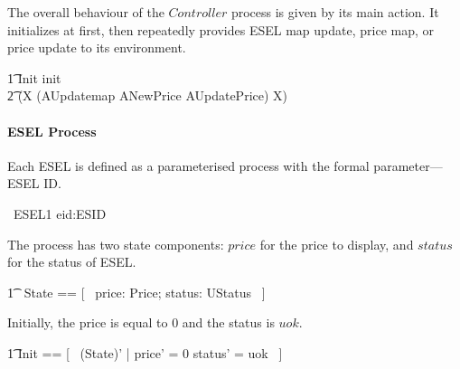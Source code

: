 The overall behaviour of the $Controller$ process is given by its main action. It initializes at first, then repeatedly provides ESEL map update, price map, or price update to its environment.
\begin{circusaction}
	\t1 \circspot \lschexpract Init \rschexpract \circseq init \then \Skip \circseq \\
    \t2 (\circmu X \circspot (AUpdatemap \extchoice ANewPrice \extchoice AUpdatePrice) \circseq X) \\
\end{circusaction}
\begin{circus}
	\circend
\end{circus}

\paragraph{ESEL Process}
Each ESEL is defined as a parameterised process with the formal parameter---ESEL ID.
\begin{circus}
	\circprocess\ ESEL1 \circdef eid:ESID \circspot \circbegin \\
\end{circus}

The process has two state components: $price$ for the price to display, and $status$ for the status of ESEL.
\begin{circusaction}
    	\t1 \circstate\ State == [~ price: Price; status: UStatus ~] \\
\end{circusaction}
Initially, the price is equal to 0 and the status is $uok$.
\begin{zed}
    	\t1	Init == [~ (State)' | price' = 0 \land status' = uok ~] \\
\end{zed}

